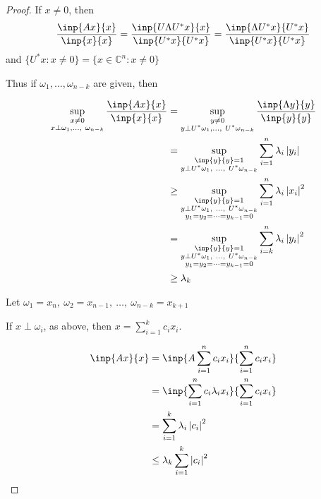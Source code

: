 \documentclass[twofold]{article}
\newcommand*\adj[1]{#1^*}
\newcommand*\abs[1]{\left \vert #1 \right\vert}
\theoremstyle{plain}
\theoremstyle{definition}
\theoremstyle{remark}
\begin{document}
\begin{proof} If \(x \neq 0\), then \[\frac{\inp{Ax}{x}}{\inp{x}{x}} = \frac{\inp{U \Lambda \adj{U} x}{x}}{\inp{\adj{U} x}{ \adj{U} x}} =  \frac{\inp{\Lambda \adj{U} x}{ \adj{U} x}}{\inp{\adj{U}x}{\adj{U}x}}\] and \( \{ \adj{U} x : x \neq 0\}  = \{ x \in \mathbb{C}^n : x \neq 0 \}\) 



Thus if \(\omega_1, \ldots , \omega_{n-k}\) are given, then 

\begin{equation*} \begin{split}
\sup_{\substack{x \neq 0 \\ x \perp \omega_1, \ldots, \ \omega_{n-k}}} \frac{\inp{Ax}{x}}{\inp{x}{x}} & = \sup_{\substack{y \neq 0 \\ y \perp \adj{U}\omega_1, \ldots ,\ \adj{U} \omega_{n-k}}} \frac{\inp{\Lambda y}{y}}{\inp{y}{y}} \\
&  = \sup_{\substack{\inp{y}{y} = 1 \\ y \perp \adj{U} \omega_1, \ \ldots , \ \adj{U}\omega_{n-k}}} \sum_{i = 1}^n \lambda_i \abs{y_i} \\
&  \ge \sup_{\substack{\inp{y}{y} = 1 \\ y \perp \adj{U} \omega_1, \ \ldots , \ \adj{U}\omega_{n-k} \\ y_1 = y_2 = \cdots = y_{k-1} = 0 }} \sum_{i = 1}^n \lambda_i \abs{x_i}^2 \\
&  = \sup_{\substack{\inp{y}{y} = 1 \\ y \perp \adj{U} \omega_1, \ \ldots , \ \adj{U}\omega_{n-k} \\ y_1 = y_2 = \cdots = y_{k-1} = 0 }} \sum_{i = k}^n \lambda_i \abs{y_i}^2 \\
&  \ge \lambda_k 
\end{split} \end{equation*}


Let \(\omega_1 = x_n , \ \omega_2 = x_{n-1}, \ \ldots , \ \omega_{n-k} = x_{k + 1}\)

If \(x\perp \omega_i\), as above, then \(x = \sum_{i = 1} ^k c_i x_i\). 

\begin{equation*} \begin{split}
\inp{Ax}{x} & = \inp{A \sum_{i = 1} ^ n c_i x_i}{ \sum_{i = 1} ^n c_i x_i} \\
&  = \inp{\sum_{i = 1} ^n c_i \lambda_i x_i}{\sum_{i = 1} ^n c_i x_i}\\
& = \sum_{i = 1} ^ k \lambda_i \abs{c_i}^2 \\
&  \le \lambda_k \sum_{i = 1} ^{k} \abs{c_i}^2
\end{split} \end{equation*}
\end{proof}
\end{document}
